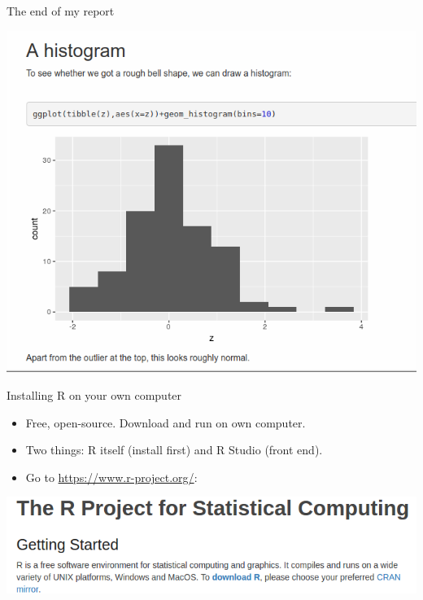 \documentclass[
  ignorenonframetext,
]{beamer}
\providecommand{\tightlist}{%
  \setlength{\itemsep}{0pt}\setlength{\parskip}{0pt}}
\begin{document}
\begin{frame}{The end of my report}
\protect\hypertarget{the-end-of-my-report}{}

\includegraphics{Screenshot_2018-06-29_17-09-23.png}

\end{frame}

\begin{frame}{Installing R on your own computer}
\protect\hypertarget{installing-r-on-your-own-computer}{}

\begin{itemize}
\tightlist
\item
  Free, open-source. Download and run on own computer.
\item
  Two things: R itself (install first) and R Studio (front end).
\item
  Go to \url{https://www.r-project.org/}:
\end{itemize}

\includegraphics{r30.png}

\end{frame}
\end{document}
